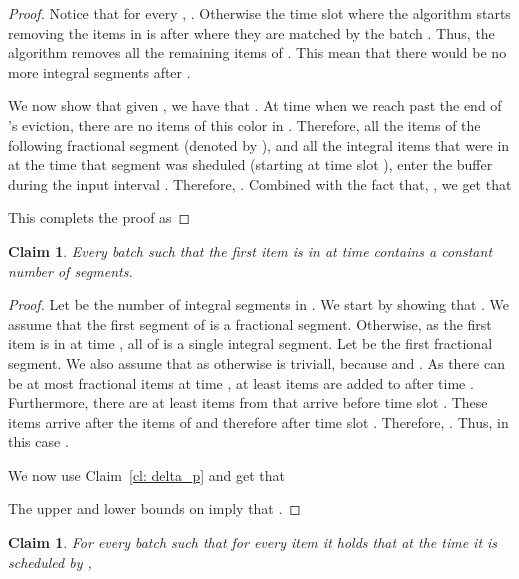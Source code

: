 \documentclass[12pt]{article}
\newtheorem{claim}[theorem]{Claim}
\begin{document}
\begin{proof}
Notice that for every , . 
Otherwise the time slot where the algorithm starts removing the items 
in  is after where they are matched by the batch .
Thus, the algorithm removes all the remaining items of . 
This mean that there would be no more integral segments after . 

We now show that given , we have that
. 
At time  when we reach past the end of 's
eviction, there are no items of this color in . Therefore, all the items 
of the following fractional segment (denoted by ), 
and all the integral items that were in  at the time
that segment  was sheduled (starting at time slot ), 
enter the buffer during the input interval . 
Therefore,
.
Combined with the fact that,
, we get that

This complets the proof as

\end{proof}

\begin{claim}\label{cl: batch before alg}
Every batch  such that the first item  is in 
at time  contains a constant number of segments.
\end{claim}

\begin{proof}
Let  be the number of integral segments in .
 We start by showing that  .
We assume that the first segment of  is a fractional segment.
Otherwise, as  the first item  is in  at time ,
all of  is a single integral segment. 
Let  be the first fractional segment. We also assume that 
 as otherwise   is triviall, 
because  and . 
As there can be at most  fractional
items at time , at least  items
are added to  after time . Furthermore, there are at least 
 items from  that arrive before time
slot . These items arrive after the items of  and therefore
after time slot .
Therefore, .
Thus, in this case .

We now use Claim~\ref{cl: delta_p} and get that 

The upper and lower bounds on  imply that .
\end{proof}

\begin{claim}\label{cl: batch after alg}
For every batch  such that for every item  it holds
that  at the time it is scheduled by ,

\end{claim}
\end{document}
